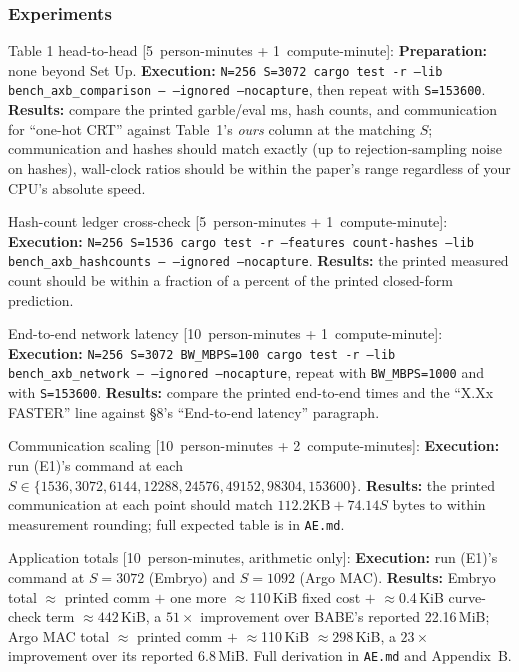 \documentclass[nonacm,sigconf]{acmart}
\begin{document}
\subsubsection{Experiments}

\begin{compactitem}
\item[(E1):] Table 1 head-to-head [5~person-minutes + 1~compute-minute]:
  \textbf{Preparation:} none beyond Set Up. \textbf{Execution:}
  \texttt{N=256 S=3072 cargo test -r --lib bench\_axb\_comparison --
  --ignored --nocapture}, then repeat with \texttt{S=153600}.
  \textbf{Results:} compare the printed garble/eval ms, hash counts, and
  communication for ``one-hot CRT'' against Table~1's \emph{ours} column at
  the matching $S$; communication and hashes should match exactly (up to
  rejection-sampling noise on hashes), wall-clock ratios should be within
  the paper's range regardless of your CPU's absolute speed.

\item[(E2):] Hash-count ledger cross-check [5~person-minutes +
  1~compute-minute]: \textbf{Execution:} \texttt{N=256 S=1536 cargo test -r
  --features count-hashes --lib bench\_axb\_hashcounts -- --ignored
  --nocapture}. \textbf{Results:} the printed measured count should be
  within a fraction of a percent of the printed closed-form prediction.

\item[(E3):] End-to-end network latency [10~person-minutes +
  1~compute-minute]: \textbf{Execution:} \texttt{N=256 S=3072 BW\_MBPS=100
  cargo test -r --lib bench\_axb\_network -- --ignored --nocapture}, repeat
  with \texttt{BW\_MBPS=1000} and with \texttt{S=153600}.
  \textbf{Results:} compare the printed end-to-end times and the
  ``X.Xx FASTER'' line against \S8's ``End-to-end latency'' paragraph.

\item[(E4):] Communication scaling [10~person-minutes + 2~compute-minutes]:
  \textbf{Execution:} run (E1)'s command at each $S \in \{1536, 3072,
  6144, 12288, 24576, 49152, 98304, 153600\}$. \textbf{Results:} the
  printed communication at each point should match
  $112.2\text{KB} + 74.14 S\text{ bytes}$ to within measurement rounding;
  full expected table is in \texttt{AE.md}.

\item[(E5):] Application totals [10~person-minutes, arithmetic only]:
  \textbf{Execution:} run (E1)'s command at $S=3072$ (Embryo) and
  $S=1092$ (Argo MAC). \textbf{Results:} Embryo total $\approx$ printed
  comm $+$ one more $\approx$110\,KiB fixed cost $+$ $\approx$0.4\,KiB
  curve-check term $\approx 442$\,KiB, a $51\times$ improvement over
  BABE's reported 22.16\,MiB; Argo MAC total $\approx$ printed comm $+$
  $\approx$110\,KiB $\approx 298$\,KiB, a $23\times$ improvement over its
  reported 6.8\,MiB. Full derivation in \texttt{AE.md} and Appendix~B.
\end{compactitem}
\end{document}

